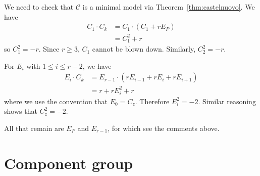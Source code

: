 \documentclass{article}
\newcommand{\scd}{\mathscr{C}}
\theoremstyle{plain}
\theoremstyle{definition}
\theoremstyle{remark}
\begin{document}
We need to check that $\scd$ is a minimal model via Theorem~\ref{thm:castelnuovo}. We have
\begin{align*}
  C_1 \cdot C_k &= C_1 \cdot (C_1 + rE_{P}) \\
  &= C_1^2 + r
\end{align*}
so $C_1^2 = -r$. Since $r \geq 3$, $C_1$ cannot be blown down. Similarly, $C_2^2 = -r$.

For $E_{i}$ with $1 \leq i \leq r-2$, we have
\begin{align*}
  E_{i} \cdot C_k &= E_{r-1} \cdot (rE_{i-1} + rE_{i} + rE_{i+1}) \\
  &= r + rE_i^2 + r
\end{align*}
where we use the convention that $E_0 = C_z$. Therefore $E_i^2 = -2$. Similar reasoning shows that $C_z^2 = -2$.

All that remain are $E_P$ and $E_{r-1}$, for which see the comments above.

\section{Component group}
\label{sec:component-group}





\end{document}
